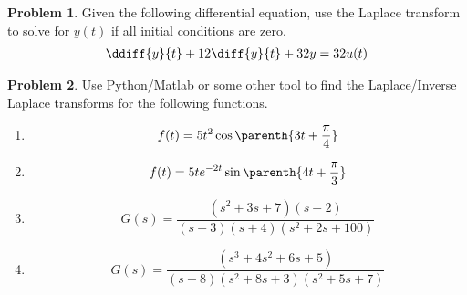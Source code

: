 \documentclass[10pt]{article}
\theoremstyle{definition}
\newtheorem{prob}{Problem}[section]
\newenvironment{subprob}%
{\renewcommand{\theenumi}{\alph{enumi}}\renewcommand{\labelenumi}{(\theenumi)}\begin{enumerate}}%
{\end{enumerate}}%
\begin{document}
\begin{prob}
    Given the following differential equation, use the Laplace transform to solve for \( y(t) \) if all initial conditions are zero. 
    \begin{align*}
        \ddiff{y}{t} + 12 \diff{y}{t} + 32 y = 32 u(t)
    \end{align*}
\end{prob}

\begin{prob}
    Use Python/Matlab or some other tool to find the Laplace/Inverse Laplace transforms for the following functions.

    \begin{subprob}
        \item \[ f(t) = 5 t^2 \cos \parenth{3 t + \frac{\pi}{4}} \]
        \item \[ f(t) = 5 t e^{-2t} \sin \parenth{4t + \frac{\pi}{3}}\]
        \item \[ G(s) = \frac{(s^2+3s+7)(s+2)}{(s+3)(s+4)(s^2+2s+100)}\]
        \item \[ G(s) = \frac{(s^3 + 4s^2 + 6s +5)}{(s+8)(s^2 + 8s+3)(s^2 + 5s+7)}\]
    \end{subprob}
\end{prob}
\end{document}
